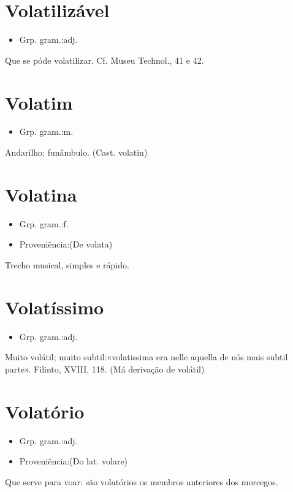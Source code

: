 \documentclass{article}
\begin{document}
\section{Volatilizável}
\begin{itemize}
\item {Grp. gram.:adj.}
\end{itemize}
Que se póde volatilizar. Cf. \textunderscore Museu Technol.\textunderscore , 41 e 42.
\section{Volatim}
\begin{itemize}
\item {Grp. gram.:m.}
\end{itemize}
Andarilho; funâmbulo.
(Cast. \textunderscore volatin\textunderscore )
\section{Volatina}
\begin{itemize}
\item {Grp. gram.:f.}
\end{itemize}
\begin{itemize}
\item {Proveniência:(De \textunderscore volata\textunderscore )}
\end{itemize}
Trecho musical, simples e rápido.
\section{Volatíssimo}
\begin{itemize}
\item {Grp. gram.:adj.}
\end{itemize}
Muito volátil; muito subtil:«\textunderscore volatissima era nelle aquella de nós mais subtil parte\textunderscore ». Filinto, XVIII, 118.
(Má derivação de \textunderscore volátil\textunderscore )
\section{Volatório}
\begin{itemize}
\item {Grp. gram.:adj.}
\end{itemize}
\begin{itemize}
\item {Proveniência:(Do lat. \textunderscore volare\textunderscore )}
\end{itemize}
Que serve para voar: \textunderscore são volatórios os membros anteriores dos morcegos\textunderscore .
\end{document}
